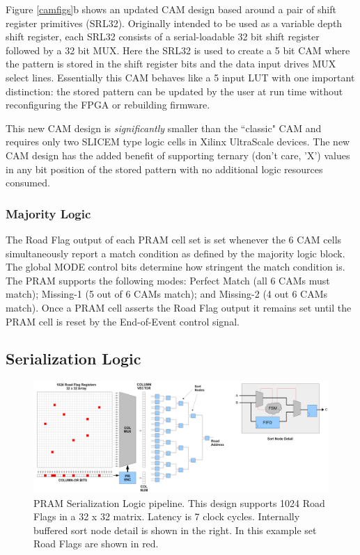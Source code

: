 \documentclass[letterpaper]{article}
\begin{document}
Figure \ref{camfigs}b shows an updated CAM design based around a pair of shift register primitives (SRL32). Originally intended to be used as a variable depth shift register, each SRL32 consists of a serial-loadable 32 bit shift register followed by a 32 bit MUX. Here the SRL32 is used to create a 5 bit CAM where the pattern is stored in the shift register bits and the data input drives MUX select lines. Essentially this CAM behaves like a 5 input LUT with one important distinction: the stored pattern can be updated by the user at run time without reconfiguring the FPGA or rebuilding firmware.

This new CAM design is \emph{significantly} smaller than the ``classic" CAM and requires only two SLICEM type logic cells in Xilinx UltraScale devices. The new CAM design has the added benefit of supporting ternary (don't care, 'X') values in any bit position of the stored pattern with no additional logic resources consumed.

\subsubsection{Majority Logic}

The Road Flag output of each PRAM cell set is set whenever the 6 CAM cells simultaneously report a match condition as defined by the majority logic block. The global MODE control bits determine how stringent the match condition is. The PRAM supports the following modes: Perfect Match (all 6 CAMs must match); Missing-1 (5 out of 6 CAMs match); and Missing-2 (4 out 6 CAMs match). Once a PRAM cell asserts the Road Flag output it remains set until the PRAM cell is reset by the End-of-Event control signal.

\subsection{Serialization Logic}

\begin{figure}
\centering
\includegraphics[width=14cm]{backend.png}
\caption[PRAM Serialization Logic]{PRAM Serialization Logic pipeline. This design supports 1024 Road Flags in a 32 x 32 matrix. Latency is 7 clock cycles. Internally buffered sort node detail is shown in the right. In this example set Road Flags are shown in red.}
\label{backend}
\end{figure}
\end{document}
